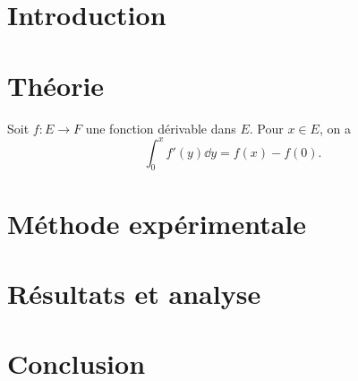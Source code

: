 \documentclass[a4paper, 11pt, UTF8]{scrartcl} %
\begin{document}
\captionsetup{labelfont=bf,textfont=bf,labelsep=period}


\maketitle



\section{Introduction}
\lipsum[7]
\section{Théorie}
Soit $f:E\to F$ une fonction dérivable dans $E$. Pour $x\in E$, on a
\[
\int_0^x f'(y)\dd{y}=f(x)-f(0).
\]

\lipsum[19]
\section{Méthode expérimentale}
\lipsum[20]
\section{Résultats et analyse}
\lipsum[30]
\section{Conclusion}
\lipsum[20]



\printbibliography[heading=bibliography,title=参考文献]
\end{document}
